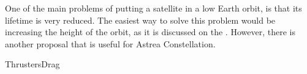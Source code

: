 
One of the main problems of putting a satellite in a low Earth orbit, is that its lifetime is very reduced. The easiest way to solve this problem would be increasing the height of the orbit, as it is discussed on the \cite[Chapter 4, Section 4]{annex1}. However, there is another proposal that is useful for Astrea Constellation.

{ThrustersDrag}